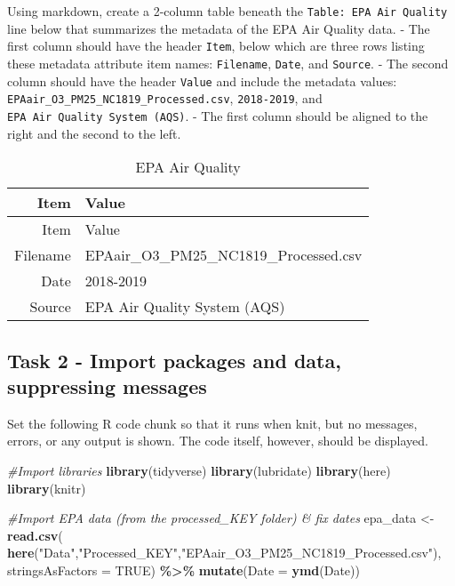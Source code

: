 \documentclass[
]{article}
\newenvironment{Shaded}{\begin{snugshade}}{\end{snugshade}}
\newcommand{\AttributeTok}[1]{\textcolor[rgb]{0.13,0.29,0.53}{#1}}
\newcommand{\CommentTok}[1]{\textcolor[rgb]{0.56,0.35,0.01}{\textit{#1}}}
\newcommand{\ConstantTok}[1]{\textcolor[rgb]{0.56,0.35,0.01}{#1}}
\newcommand{\FunctionTok}[1]{\textcolor[rgb]{0.13,0.29,0.53}{\textbf{#1}}}
\newcommand{\NormalTok}[1]{#1}
\newcommand{\OtherTok}[1]{\textcolor[rgb]{0.56,0.35,0.01}{#1}}
\newcommand{\SpecialCharTok}[1]{\textcolor[rgb]{0.81,0.36,0.00}{\textbf{#1}}}
\newcommand{\StringTok}[1]{\textcolor[rgb]{0.31,0.60,0.02}{#1}}
\begin{document}
Using markdown, create a 2-column table beneath the
\texttt{Table:\ EPA\ Air\ Quality} line below that summarizes the
metadata of the EPA Air Quality data. - The first column should have the
header \texttt{Item}, below which are three rows listing these metadata
attribute item names: \texttt{Filename}, \texttt{Date}, and
\texttt{Source}. - The second column should have the header
\texttt{Value} and include the metadata values:
\texttt{EPAair\_O3\_PM25\_NC1819\_Processed.csv}, \texttt{2018-2019},
and \texttt{EPA\ Air\ Quality\ System\ (AQS)}. - The first column should
be aligned to the right and the second to the left.

\begin{longtable}[]{@{}rl@{}}
\caption{EPA Air Quality}\tabularnewline
\toprule\noalign{}
Item & Value \\
\midrule\noalign{}
\endfirsthead
\toprule\noalign{}
Item & Value \\
\midrule\noalign{}
\endhead
\bottomrule\noalign{}
\endlastfoot
Filename & EPAair\_O3\_PM25\_NC1819\_Processed.csv \\
Date & 2018-2019 \\
Source & EPA Air Quality System (AQS) \\
\end{longtable}

\subsection{Task 2 - Import packages and data, suppressing
messages}\label{task-2---import-packages-and-data-suppressing-messages}

Set the following R code chunk so that it runs when knit, but no
messages, errors, or any output is shown. The code itself, however,
should be displayed.

\begin{Shaded}
\begin{Highlighting}[]
\CommentTok{\#Import libraries}
\FunctionTok{library}\NormalTok{(tidyverse)}
\FunctionTok{library}\NormalTok{(lubridate)}
\FunctionTok{library}\NormalTok{(here)}
\FunctionTok{library}\NormalTok{(knitr)}

\CommentTok{\#Import EPA data (from the processed\_KEY folder) \& fix dates}
\NormalTok{epa\_data }\OtherTok{\textless{}{-}} \FunctionTok{read.csv}\NormalTok{(}
  \FunctionTok{here}\NormalTok{(}\StringTok{"Data"}\NormalTok{,}\StringTok{"Processed\_KEY"}\NormalTok{,}\StringTok{"EPAair\_O3\_PM25\_NC1819\_Processed.csv"}\NormalTok{),}
  \AttributeTok{stringsAsFactors =} \ConstantTok{TRUE}\NormalTok{) }\SpecialCharTok{\%\textgreater{}\%} 
  \FunctionTok{mutate}\NormalTok{(}\AttributeTok{Date =} \FunctionTok{ymd}\NormalTok{(Date))}
\end{Highlighting}
\end{Shaded}
\end{document}
